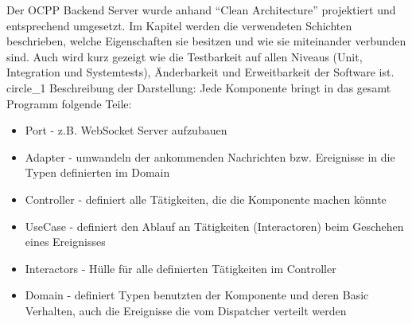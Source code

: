 
    Der OCPP Backend Server wurde anhand ``Clean Architecture'' projektiert und entsprechend umgesetzt. 
    Im Kapitel werden die verwendeten Schichten beschrieben, welche Eigenschaften sie besitzen und wie sie miteinander verbunden sind.
    Auch wird kurz gezeigt wie die Testbarkeit auf allen Niveaus (Unit, Integration und Systemtests), 
    Änderbarkeit und Erweitbarkeit der Software ist.    
    {circle_1}
    Beschreibung der Darstellung:
    Jede Komponente bringt in das gesamt Programm folgende Teile:
    \begin{itemize}
        \item Port - z.B. WebSocket Server aufzubauen
        \item Adapter  - umwandeln der ankommenden Nachrichten bzw. Ereignisse in die Typen definierten im Domain
        \item Controller - definiert alle Tätigkeiten, die die Komponente machen könnte
        \item UseCase - definiert den Ablauf an Tätigkeiten (Interactoren) beim Geschehen eines Ereignisses
        \item Interactors - Hülle für alle definierten Tätigkeiten im Controller
        \item Domain - definiert Typen benutzten der Komponente und deren Basic Verhalten, auch die Ereignisse die vom Dispatcher verteilt werden
    \end{itemize}
